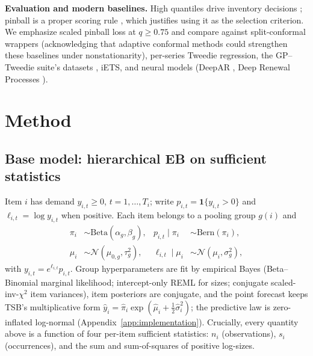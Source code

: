 \documentclass[twocolumn,10pt]{article}
\newcommand{\ind}[1]{\mathbf{1}\{#1\}}
\begin{document}
\textbf{Evaluation and modern baselines.} High quantiles drive inventory
decisions \citep{kolassa2016}; pinball is a proper scoring rule
\citep{gneiting2007}, which justifies using it as the selection
criterion. We emphasize scaled pinball loss \citep{makridakis2022} at
$q\ge0.75$ and compare against split-conformal wrappers \citep{lei2018}
(acknowledging that adaptive conformal methods
\citep{gibbs2021} could strengthen these baselines under
nonstationarity), per-series Tweedie regression, the GP--Tweedie suite's
datasets \citep{damato2025}, iETS, and neural models (DeepAR
\citep{salinas2020}, Deep Renewal Processes \citep{turkmen2019}).

\section{Method}\label{sec:method}

\subsection{Base model: hierarchical EB on sufficient statistics}
\label{sec:base}
Item $i$ has demand $y_{i,t}\ge0$, $t=1,\dots,T_i$; write
$p_{i,t}=\ind{y_{i,t}>0}$ and $\ell_{i,t}=\log y_{i,t}$ when positive.
Each item belongs to a pooling group $g(i)$ and
\begin{align}
\pi_i &\sim \mathrm{Beta}(\alpha_g,\beta_g), &
p_{i,t}\mid\pi_i &\sim \mathrm{Bern}(\pi_i),\nonumber\\
\mu_i &\sim \mathcal{N}(\mu_{0,g},\tau^2_g), &
\ell_{i,t}\mid\mu_i &\sim \mathcal{N}(\mu_i,\sigma^2_g),
\label{eq:model}
\end{align}
with $y_{i,t}=e^{\ell_{i,t}}p_{i,t}$. Group hyperparameters are fit by
empirical Bayes (Beta--Binomial marginal likelihood; intercept-only REML
for sizes; conjugate scaled-inv-$\chi^2$ item variances), item posteriors
are conjugate, and the point forecast keeps TSB's multiplicative form
$\hat y_i=\hat\pi_i\exp(\hat\mu_i+\tfrac12\hat\sigma^2_i)$; the predictive
law is zero-inflated log-normal
(Appendix~\ref{app:implementation}). Crucially, every quantity above is a
function of four per-item sufficient statistics:
$n_i$ (observations), $s_i$ (occurrences), and the sum and sum-of-squares
of positive log-sizes.
\end{document}
